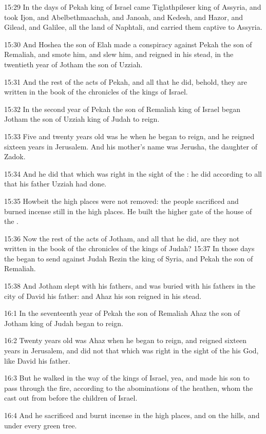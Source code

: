 15:29 In the days of Pekah king of Israel came Tiglathpileser king of
Assyria, and took Ijon, and Abelbethmaachah, and Janoah, and Kedesh,
and Hazor, and Gilead, and Galilee, all the land of Naphtali, and
carried them captive to Assyria.

15:30 And Hoshea the son of Elah made a conspiracy against Pekah the
son of Remaliah, and smote him, and slew him, and reigned in his
stead, in the twentieth year of Jotham the son of Uzziah.

15:31 And the rest of the acts of Pekah, and all that he did, behold,
they are written in the book of the chronicles of the kings of Israel.

15:32 In the second year of Pekah the son of Remaliah king of Israel
began Jotham the son of Uzziah king of Judah to reign.

15:33 Five and twenty years old was he when he began to reign, and he
reigned sixteen years in Jerusalem. And his mother's name was Jerusha,
the daughter of Zadok.

15:34 And he did that which was right in the sight of the \LORD: he did
according to all that his father Uzziah had done.

15:35 Howbeit the high places were not removed: the people sacrificed
and burned incense still in the high places. He built the higher gate
of the house of the \LORD.

15:36 Now the rest of the acts of Jotham, and all that he did, are
they not written in the book of the chronicles of the kings of Judah?
15:37 In those days the \LORD began to send against Judah Rezin the
king of Syria, and Pekah the son of Remaliah.

15:38 And Jotham slept with his fathers, and was buried with his
fathers in the city of David his father: and Ahaz his son reigned in
his stead.

16:1 In the seventeenth year of Pekah the son of Remaliah Ahaz the son
of Jotham king of Judah began to reign.

16:2 Twenty years old was Ahaz when he began to reign, and reigned
sixteen years in Jerusalem, and did not that which was right in the
sight of the \LORD his God, like David his father.

16:3 But he walked in the way of the kings of Israel, yea, and made
his son to pass through the fire, according to the abominations of the
heathen, whom the \LORD cast out from before the children of Israel.

16:4 And he sacrificed and burnt incense in the high places, and on
the hills, and under every green tree.

